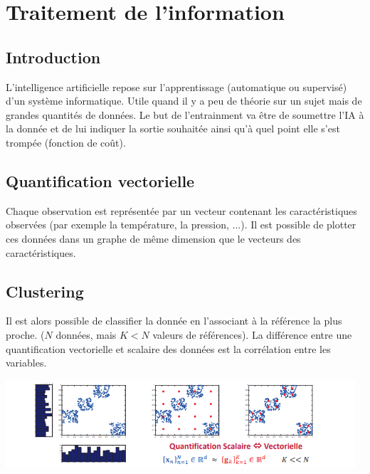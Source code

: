 \documentclass[a4paper,12pt,oneside]{report}	%
\begin{document}
\chapter{Traitement de l'information}
    \section{Introduction}
        L'intelligence artificielle repose sur l'apprentissage (automatique ou supervisé) d'un système informatique. Utile quand il y a peu de théorie sur un sujet mais de grandes quantités de données. Le but de l'entrainment va être de soumettre l'IA à la donnée et de lui indiquer la sortie souhaitée ainsi qu'à quel point elle s'est trompée (fonction de coût).
    \section{Quantification vectorielle}
        Chaque observation est représentée par un vecteur contenant les caractéristiques observées (par exemple la température, la pression, ...). Il est possible de plotter ces données dans un graphe de même dimension que le vecteurs des caractéristiques. 

    \section{Clustering}
        Il est alors possible de classifier la donnée en l'associant à la référence la plus proche. ($N$ données, mais $K<N$ valeurs de références). La différence entre une quantification vectorielle et scalaire des données est la corrélation entre les variables.
        \begin{center}
            \includegraphics[width=13cm]{LaTeX/pictures/2.3_1.png}
        \end{center}
        
\end{document}
